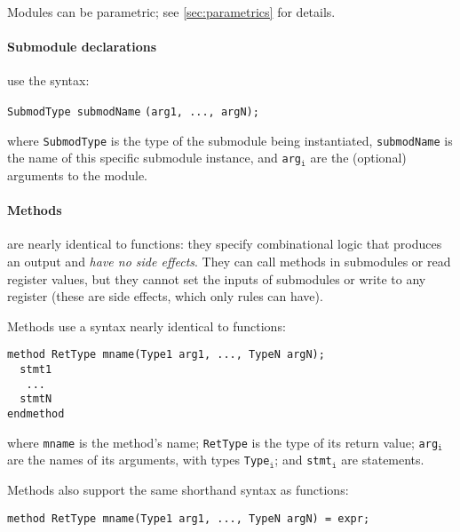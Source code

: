 Modules can be parametric; see \autoref{sec:parametrics} for details.

\paragraph{Submodule declarations} use the syntax:
\begin{center}
  \verb|SubmodType submodName| \optStart \verb|(arg1, ..., argN)|\optEnd\verb|;|
\end{center}
where \verb|SubmodType| is the type of the submodule being instantiated,
\verb|submodName| is the name of this specific submodule instance,
and \verb|arg|$_{\texttt{i}}$ are the (optional) arguments to the module.


\paragraph{Methods} 
are nearly identical to functions:
they specify combinational logic that produces an output
and \emph{have no side effects}.
They can call methods in submodules or read register values,
but they cannot set the inputs of submodules or write to any register
(these are side effects, which only rules can have).

Methods use a syntax nearly identical to functions:
\begin{center}
\verb|method RetType mname(Type1 arg1, ..., TypeN argN);| \\
\verb|  stmt1                                           | \\
\verb|   ...                                            | \\
\verb|  stmtN                                           | \\
\verb|endmethod                                         |
\end{center}
where \verb|mname| is the method's name;
\verb|RetType| is the type of its return value;
\verb|arg|$_{\texttt{i}}$ are the names of its arguments,
with types \verb|Type|$_{\texttt{i}}$;
and \verb|stmt|$_{\texttt{i}}$ are statements.

Methods also support the same shorthand syntax as functions:
\begin{center}
\verb|method RetType mname(Type1 arg1, ..., TypeN argN) = expr;|
\end{center}


